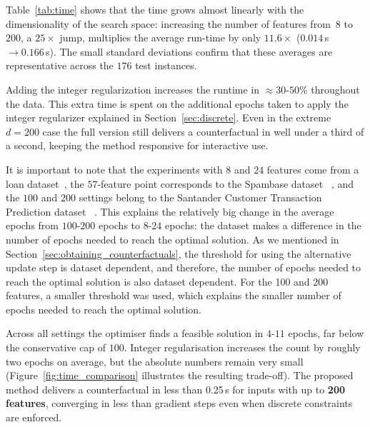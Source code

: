 \documentclass[12pt]{extarticle}
\numberwithin{equation}{section}
\begin{document}
Table~\ref{tab:time} shows that the time grows almost linearly with the dimensionality of the search space: increasing the number of features from~$8$ to~$200$, a $25\times$ jump, multiplies the average run-time by only $11.6\times$ ($0.014\,$s $\rightarrow 0.166\,$s). The small standard deviations confirm that these averages are representative across the $176$ test instances.

Adding the integer regularization increases the runtime in $\approx 30\text{-}50\%$ throughout the data. This extra time is spent on the additional epochs taken to apply the integer regularizer explained in Section~\ref{sec:discrete}. Even in the extreme $d=200$ case the full version still
delivers a counterfactual in well under a third of a second, keeping the
method responsive for interactive use.

It is important to note that the experiments with $8$ and $24$ features come from a loan dataset~\cite{kaggleLoan1}, the $57$-feature point corresponds to the Spambase dataset ~\cite{spambase}, and the $100$ and $200$ settings belong to the Santander Customer Transaction Prediction dataset ~\cite{santander}. This explains the relatively big change in the average epochs from $100$-$200$ epochs to $8$-$24$ epochs: the dataset makes a difference in the number of epochs needed to reach the optimal solution. As we mentioned in Section~\ref{sec:obtaining_counterfactuals}, the threshold for using the alternative update step is dataset dependent, and therefore, the number of epochs needed to reach the optimal solution is also dataset dependent. For the 100 and 200 features, a smaller threshold was used, which explains the smaller number of epochs needed to reach the optimal solution. 

Across all settings the optimiser finds a feasible solution in $4$-$11$ epochs, far below the conservative cap of $100$.  Integer regularisation increases the count by roughly two epochs on average, but the absolute numbers remain very small (Figure~\ref{fig:time_comparison} illustrates the resulting trade-off). The proposed method delivers a counterfactual in less than 0.25\,s for inputs with up to \textbf{200 features}, converging in less than gradient steps even when discrete constraints are enforced.
\end{document}
